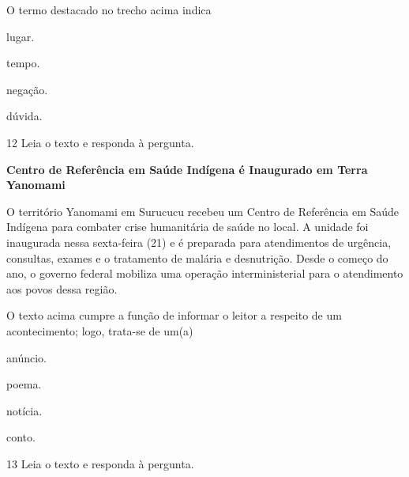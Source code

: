 O termo destacado no trecho acima indica

\begin{multicols}{2}
\begin{escolha}
  \item lugar.

  \item tempo.

  \item negação.

  \item dúvida.
\end{escolha}
\end{multicols}

\num{12} Leia o texto e responda à pergunta.

\begin{myquote}
\textbf{Centro de Referência em Saúde Indígena é Inaugurado em Terra
Yanomami}

O território Yanomami em Surucucu recebeu um Centro de Referência em
Saúde Indígena para combater crise humanitária de saúde no local. A
unidade foi inaugurada nessa sexta-feira (21) e é preparada para
atendimentos de urgência, consultas, exames e o tratamento de malária e
desnutrição. Desde o começo do ano, o governo federal mobiliza uma
operação interministerial para o atendimento aos povos dessa região.

\end{myquote}

\pagebreak
O texto acima cumpre a função de informar o leitor a respeito de um
acontecimento; logo, trata-se de um(a)

\begin{multicols}{2}
\begin{escolha}
  \item anúncio.

  \item poema.

  \item notícia.

  \item conto.
\end{escolha}
\end{multicols}

\num{13} Leia o texto e responda à pergunta.


